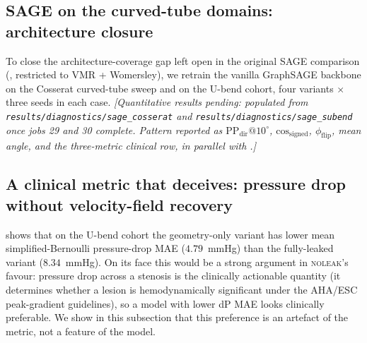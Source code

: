 \documentclass[10pt,a4paper]{article}
\makeatletter
\newcommand{\noleak}{\textsc{noleak}}
\newcommand{\PPdir}[1]{\mathrm{PP_{dir}}@#1^\circ}
\newcommand{\cosgn}{\mathrm{cos}_\mathrm{signed}}
\newcommand{\fracflip}{\phi_\mathrm{flip}}
\makeatother
\begin{document}
\subsection*{SAGE on the curved-tube domains: architecture closure}
\label{sec:sage_curved}

To close the architecture-coverage gap left open in the original
SAGE comparison (, restricted to VMR + Womersley),
we retrain the vanilla GraphSAGE backbone on the Cosserat
curved-tube sweep and on the U-bend cohort, four variants $\times$
three seeds in each case. \textit{[Quantitative results pending:
populated from \texttt{results/diagnostics/sage\_cosserat} and
\texttt{results/diagnostics/sage\_subend} once jobs 29 and 30
complete. Pattern reported as $\PPdir{10}$, $\cosgn$,
$\fracflip$, mean angle, and the three-metric clinical row, in
parallel with .]}

\subsection*{A clinical metric that deceives: pressure drop without velocity-field recovery}
\label{sec:dp_deception}

 shows that on the U-bend cohort the
geometry-only variant has lower mean simplified-Bernoulli
pressure-drop MAE ($4.79$~mmHg) than the fully-leaked variant
($8.34$~mmHg). On its face this would be a strong argument in
\noleak{}'s favour: pressure drop across a stenosis is the
clinically actionable quantity (it determines whether a lesion is
hemodynamically significant under the AHA/ESC peak-gradient
guidelines), so a model with lower dP MAE looks clinically
preferable. We show in this subsection that this preference is an
artefact of the metric, not a feature of the model.
\end{document}
